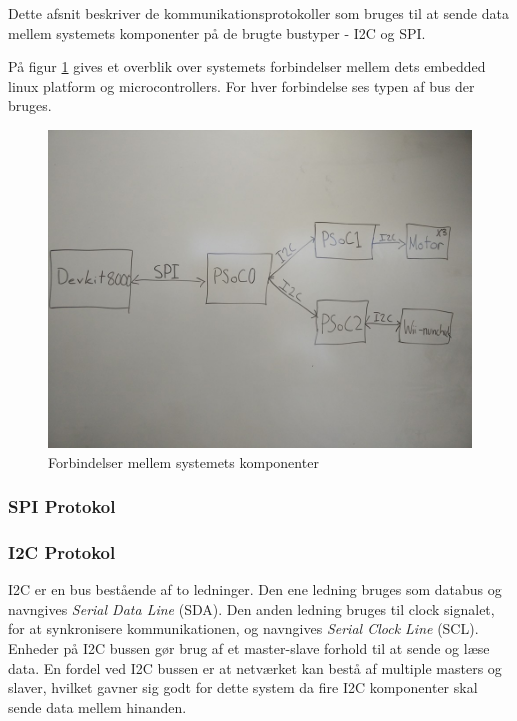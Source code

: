 Dette afsnit beskriver de kommunikationsprotokoller som bruges til at sende data mellem systemets komponenter på de brugte bustyper - I2C og SPI.

På figur \ref{fig:kommunikationsOverblik} gives et overblik over systemets forbindelser mellem dets embedded linux platform og microcontrollers. For hver forbindelse ses typen af bus der bruges.

\begin{figure}[H]
	\centering
	\includegraphics[width=\textwidth] {Systemarkitektur/images/overordnetstruktur}
	\caption{Forbindelser mellem systemets komponenter}
	\label{fig:kommunikationsOverblik}
\end{figure}

\subsubsection{SPI Protokol}

\subsubsection{I2C Protokol}

I2C\cite{I2C} er en bus bestående af to ledninger. Den ene ledning bruges som databus og navngives \textit{Serial Data Line} (SDA). Den anden ledning bruges til clock signalet, for at synkronisere kommunikationen, og navngives \textit{Serial Clock Line} (SCL). Enheder på I2C bussen gør brug af et master-slave forhold til at sende og læse data. En fordel ved I2C bussen er at netværket kan bestå af multiple masters og slaver, hvilket gavner sig godt for dette system da fire I2C komponenter skal sende data mellem hinanden.

